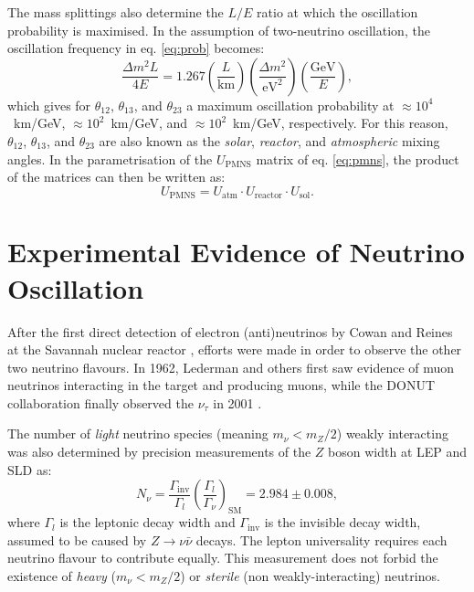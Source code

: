 The mass splittings also determine the $L/E$ ratio at which the oscillation probability is maximised. In the assumption of two-neutrino oscillation, the oscillation frequency in eq. \eqref{eq:prob} becomes:
\begin{equation}
     \frac{\Delta m^{2}L}{4E} = 1.267\left(\frac{L}{\mathrm{km}}\right)\left(\frac{\Delta m^2}{\mathrm{eV}^2}\right)\left(\frac{\mathrm{GeV}}{E}\right),
\end{equation} 
which gives for $\theta_{12}$, $\theta_{13}$, and $\theta_{23}$ a maximum oscillation probability at $\approx 10^4$~km/GeV, $\approx 10^2$~km/GeV, and $\approx 10^2$~km/GeV, respectively. For this reason, $\theta_{12}$, $\theta_{13}$, and $\theta_{23}$ are also known as the \emph{solar}, \emph{reactor}, and \emph{atmospheric} mixing angles. In the parametrisation of the $U_{\mathrm{PMNS}}$ matrix of eq. \eqref{eq:pmns}, the product of the matrices can then be written as:
\begin{equation}
    U_{\mathrm{PMNS}} = U_{\mathrm{atm}} \cdot U_{\mathrm{reactor}} \cdot U_{\mathrm{sol}}.
\end{equation}



\section{Experimental Evidence of Neutrino Oscillation}
After the first direct detection of electron (anti)neutrinos by Cowan and Reines at the Savannah nuclear reactor \cite{Cowan:1992xc}, efforts were made in order to observe the other two neutrino flavours.
In 1962, Lederman and others \cite{PhysRevLett.9.36} first saw evidence of muon neutrinos interacting in the target and producing muons, while the DONUT collaboration finally observed the $\nu_{\tau}$ in 2001 \cite{Kodama:2000mp}.

The number of \emph{light} neutrino species (meaning $m_{\nu} < m_{Z}/2$) weakly interacting was also determined by precision measurements of the $Z$ boson width at LEP and SLD \cite{ALEPH:2005ab} as:
\begin{equation}
   N_{\nu} = \frac{\Gamma_{\mathrm{inv}}}{\Gamma_l}
   \left(\frac{\Gamma_{l}}{\Gamma_{\nu}}\right)_{\mathrm{SM}}=2.984\pm0.008,
\end{equation}
where $\Gamma_{l}$ is the leptonic decay width and $\Gamma_{\mathrm{inv}}$ is the invisible decay width, assumed to be caused by $Z\rightarrow\nu\bar{\nu}$ decays. The lepton universality requires each neutrino flavour to contribute equally. This measurement does not forbid the existence of \emph{heavy} ($m_{\nu} < m_{Z}/2$) or \emph{sterile} (non weakly-interacting) neutrinos.

